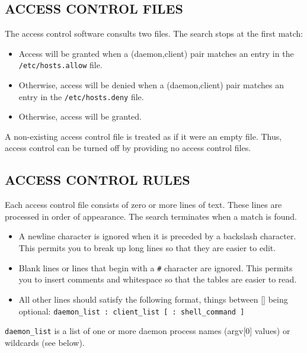\documentclass[11pt,twoside,onecolumn]{book}
\begin{document}
\subsection*{ACCESS CONTROL FILES}

The access control software consults two files. The search stops
at the first match:

\begin{itemize}
\item Access will be granted when a (daemon,client) pair matches an entry in
the {\tt /etc/hosts.allow} file.

\item Otherwise, access will be denied when a (daemon,client) pair matches an
entry in the {\tt /etc/hosts.deny} file.

\item Otherwise, access will be granted.

\end{itemize}

A non-existing access control file is treated as if it were an empty
file. Thus, access control can be turned off by providing no access
control files.

\subsection*{ACCESS CONTROL RULES}

Each access control file consists of zero or more lines of text.  These
lines are processed in order of appearance. The search terminates when a
match is found.

\begin{itemize}

\item A newline character is ignored when it is preceded by a backslash
character. This permits you to break up long lines so that they are
easier to edit.

\item Blank lines or lines that begin with a {\tt \#} character are ignored.
This permits you to insert comments and whitespace so that the tables
are easier to read.

\item All other lines should satisfy the following format, things between []
being optional: {\tt daemon\_list : client\_list [ : shell\_command ] }

\end{itemize}

{\tt daemon\_list} is a list of one or more daemon process names
(argv[0] values) or wildcards (see below).  
\end{document}
